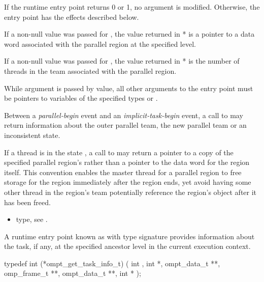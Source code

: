 \effect

If the runtime entry point returns 0 or 1, no argument is modified. Otherwise,
the entry point has the effects described below.

If a non-null value was passed for , the
value returned in * is a pointer to a data word
associated with the parallel region at the specified level.

If a non-null value was passed for , the value
returned in * is the number of threads in the team
associated with the parallel region.

\constraints
While argument  is passed by
value, all other arguments to the entry point must be pointers
to variables of the specified types or .


\restrictions
Between a \emph{parallel-begin} event and an \emph{implicit-task-begin}
event, a call to  may return
information about the outer parallel team, the new parallel team or an
inconsistent state.

If a thread is in the state ,
a call to 
may return a pointer to a copy of the specified parallel region's 
rather than a pointer to the data word for the region itself. This convention enables the master thread
for a parallel region to free storage for the region immediately after the region ends, yet
avoid having some other thread in the region's team
potentially reference the region's  object after it has been freed.

\crossreferences
\begin{itemize}
\item {} type, see .
\end{itemize}

\label{sec:ompt_get_task_info_t}
\label{sec:ompt_get_task_info}

\summary
A runtime entry point known as 
with type signature  provides information about the
task, if any, at the specified ancestor level in the current execution
context.

\format
\begin{ccppspecific}
\begin{omptInquiry}
typedef int (*ompt_get_task_info_t) (
  int ,
  int *,
  ompt_data_t **,
  omp_frame_t **,
  ompt_data_t **,
  int *
);
\end{omptInquiry}
\end{ccppspecific}

